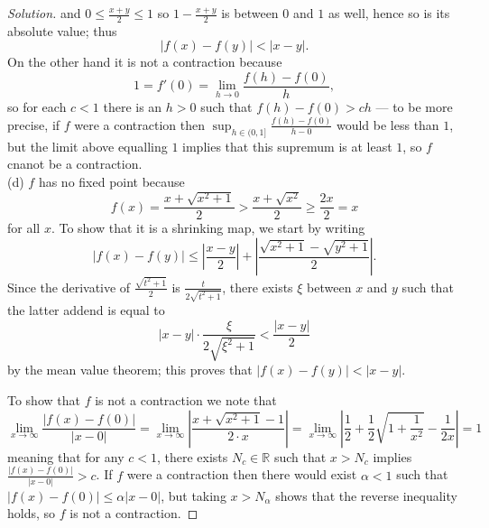 \documentclass[10pt]{article}
\providecommand{\half}{\frac{1}{2}}
\providecommand{\RR}{\mathbb R}
\newenvironment{soln}{\begin{proof}[Solution]}{\end{proof}}
\providecommand{\abs}[1]{\left|#1\right|}
\begin{document}
\begin{soln}
    and $0\le \frac{x+y}{2} \le 1$ so $1 - \frac{x+y}2$
    is between $0$ and $1$ as well, hence so is its absolute value; thus
    \begin{equation*}
	\abs{f(x) - f(y)} < \abs{x-y}.
    \end{equation*}
    On the other hand it is not a contraction because
    \begin{equation*}
	1 = f'(0) = \lim_{h\to 0} \frac{f(h) - f(0)}{h},
    \end{equation*}
    so for each $c<1$ there is an $h>0$ such that $f(h) - f(0) > ch$ ---
    to be more precise, if $f$ were a contraction then
    $\sup_{h\in(0,1]} \frac{f(h)-f(0)}{h-0}$ would be less than $1$,
    but the limit above equalling $1$ implies that this supremum
    is at least $1$, so $f$ cnanot be a contraction.
    \\

    (d) $f$ has no fixed point because
    \begin{equation*}
	f(x) = \frac{x + \sqrt{x^2+1}}2 > \frac{x + \sqrt{x^2}}2 \ge \frac{2x}2 = x
    \end{equation*}
    for all $x$. To show that it is a shrinking map, we start by writing
    \begin{equation*}
	\abs{f(x) - f(y)} \le \abs{\frac{x-y}2} +
	\abs{\frac{\sqrt{x^2+1} - \sqrt{y^2+1}}2}.
    \end{equation*}
    Since the derivative of $\frac{\sqrt{t^2+1}}2$ is $\frac{t}{2\sqrt{t^2+1}}$,
    there exists $\xi$ between $x$ and $y$ such that
    the latter addend is equal to
    \begin{equation*}
	\abs{x-y}\cdot \frac{\xi}{2\sqrt{\xi^2+1}}
	< \frac{\abs{x-y}}{2}
    \end{equation*}
    by the mean value theorem; this proves that $\abs{f(x) - f(y)} < \abs{x-y}$.

    To show that $f$ is not a contraction we note that
    \begin{equation*}
	\lim_{x\to\infty}\frac{\abs{f(x)-f(0)}}{\abs{x-0}} =
	\lim_{x\to\infty} \abs{\frac{x + \sqrt{x^2+1} - 1}{2\cdot x}}
	= \lim_{x\to\infty} \abs{\half + \half\sqrt{1 + \frac1{x^2}} - \frac{1}{2x}}
	= 1
    \end{equation*}
    meaning that for any $c<1$, there exists $N_c\in\RR$ such that
    $x > N_c$ implies $\frac{\abs{f(x)-f(0)}}{\abs{x-0}} > c$.
    If $f$ were a contraction then there would exist $\alpha<1$ such that
    $\abs{f(x) - f(0)} \le \alpha\abs{x-0}$, but taking $x > N_\alpha$
    shows that the reverse inequality holds, so $f$ is not a contraction.
\end{soln}
\end{document}
